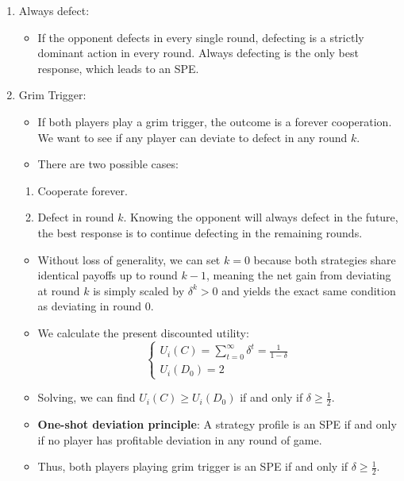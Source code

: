 \documentclass[notitlepage]{article}
\begin{document}
\begin{itemize}
\begin{enumerate}
    \item Always defect:
    \begin{itemize}
        \item If the opponent defects in every single round, defecting is a strictly dominant action in every round. Always defecting is the only best response, which leads to an SPE.
    \end{itemize}
    \item Grim Trigger:
    \begin{itemize}
        \item If both players play a grim trigger, the outcome is a forever cooperation. We want to see if any player can deviate to defect in any round \(k\).
        \item There are two possible cases:
    \end{itemize}
    \begin{enumerate}
        \item Cooperate forever.
        \item Defect in round \(k\). Knowing the opponent will always defect in the future, the best response is to continue defecting in the remaining rounds.
    \end{enumerate}
    \begin{itemize}
        \item Without loss of generality, we can set \(k = 0\) because both strategies share identical payoffs up to round \(k-1\), meaning the net gain from deviating at round \(k\) is simply scaled by \(\delta^k > 0\) and yields the exact same condition as deviating in round 0.
        \item We calculate the present discounted utility:
        \[
        \begin{cases}
            U_i(C) = \sum_{t=0}^\infty \delta^t = \frac{1}{1-\delta} \\
            U_i(D_0) = 2
        \end{cases}
        \]
        \item Solving, we can find \(U_i(C) \ge U_i(D_0)\) if and only if \(\delta \ge \frac{1}{2}\). 
        \item \textbf{One-shot deviation principle}: A strategy profile is an SPE if and only if no player has profitable deviation in any round of game.
        \item Thus, both players playing grim trigger is an SPE if and only if \(\delta \ge \frac{1}{2}\).
    \end{itemize}

\end{enumerate}
\end{itemize}
\end{document}
